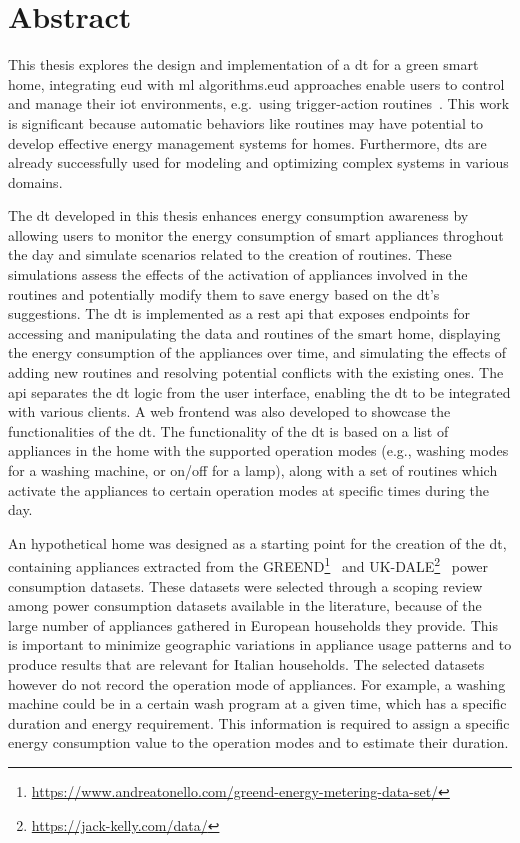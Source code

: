 \section*{Abstract}

This thesis explores the design and implementation of a \acrfull*{dt} for a green smart home, integrating \acrfull*{eud} with \acrfull*{ml} algorithms.\@ \acrshort*{eud} approaches enable users to control and manage their \acrfull*{iot} environments, e.g.\ using trigger-action routines~\parencite{barricelliEnduserDevelopmentEnduser2019}. This work is significant because automatic behaviors like routines may have potential to develop effective energy management systems for homes. Furthermore, \acrshort*{dt}s are already successfully used for modeling and optimizing complex systems
in various domains.

The \acrshort*{dt} developed in this thesis enhances energy consumption awareness by allowing users to monitor the energy consumption of smart appliances throghout the day and simulate scenarios related to the creation of routines. These simulations assess the effects of the activation of appliances involved in the routines and potentially modify them to save energy based on the \acrshort*{dt}'s suggestions. The \acrshort*{dt} is implemented as a \acrfull*{rest} \acrfull*{api} that exposes endpoints for accessing and manipulating the data and routines of the smart home, displaying the energy consumption of the appliances over time, and simulating the effects of adding new routines and resolving potential conflicts with the existing ones. The \acrshort*{api} separates the \acrshort*{dt} logic from the user interface, enabling the \acrshort*{dt} to be integrated with various clients. A web frontend was also developed to showcase the functionalities of the \acrshort*{dt}. The functionality of the \acrshort{dt} is based on a list of appliances in the home with the supported operation modes (e.g., washing modes for a washing machine, or on/off for a lamp), along with a set of routines which activate the appliances to certain operation modes at specific times during the day.

An hypothetical home was designed as a starting point for the creation of the \acrshort*{dt}, containing appliances extracted from the GREEND\footnote{\url{https://www.andreatonello.com/greend-energy-metering-data-set/}}~\parencite{monacchiGREENDEnergyConsumption2014} and UK-DALE\footnote{\url{https://jack-kelly.com/data/}}~\parencite{kellyUKDALEDatasetDomestic2015} power consumption datasets. These datasets were selected through a scoping review among power consumption datasets available in the literature, because of the large number of appliances gathered in European households they provide. This is important to minimize geographic variations in appliance usage patterns and to produce results that are relevant for Italian households. The selected datasets however do not record the operation mode of appliances. For example, a washing machine could be in a certain wash program at a given time, which has a specific duration and energy requirement. This information is required to assign a specific energy consumption value to the operation modes and to estimate their duration.

